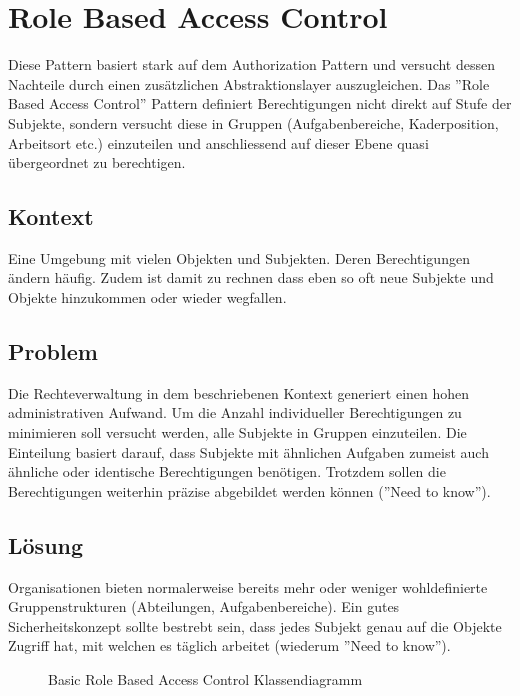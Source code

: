 \section{Role Based Access Control}
\label{sec:rbac}

Diese Pattern basiert stark auf dem Authorization Pattern und versucht dessen Nachteile durch einen zusätzlichen Abstraktionslayer auszugleichen.
Das ''Role Based Access Control'' Pattern definiert Berechtigungen nicht direkt auf Stufe der Subjekte, sondern versucht diese in Gruppen (Aufgabenbereiche, Kaderposition, Arbeitsort etc.) einzuteilen und anschliessend auf dieser Ebene quasi übergeordnet zu berechtigen.

\subsection*{Kontext}
Eine Umgebung mit vielen Objekten und Subjekten. Deren Berechtigungen ändern häufig. Zudem ist damit zu rechnen dass eben so oft neue Subjekte und Objekte hinzukommen oder wieder wegfallen.

\subsection*{Problem}
Die Rechteverwaltung in dem beschriebenen Kontext generiert einen hohen administrativen Aufwand. Um die Anzahl individueller Berechtigungen zu minimieren soll versucht werden, alle Subjekte in Gruppen einzuteilen. Die Einteilung basiert darauf, dass Subjekte mit ähnlichen Aufgaben zumeist auch ähnliche oder identische Berechtigungen benötigen.
Trotzdem sollen die Berechtigungen weiterhin präzise abgebildet werden können (''Need to know'').

\subsection*{Lösung}
Organisationen bieten normalerweise bereits mehr oder weniger wohldefinierte Gruppenstrukturen (Abteilungen, Aufgabenbereiche).
Ein gutes Sicherheitskonzept sollte bestrebt sein, dass jedes Subjekt genau auf die Objekte Zugriff hat, mit welchen es täglich arbeitet (wiederum ''Need to know'').

\begin{figure}[H]
	\begin{center}
	\end{center}
	\caption{Basic Role Based Access Control Klassendiagramm}
\end{figure}

